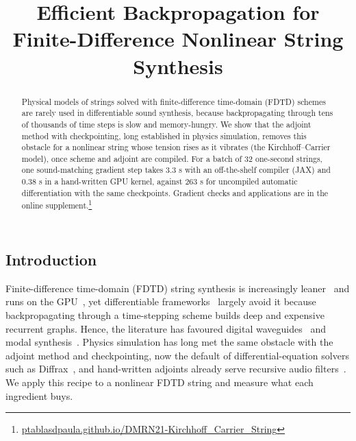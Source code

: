 \documentclass[a4paper]{article}
\title{Efficient Backpropagation for\\Finite-Difference Nonlinear String Synthesis}
\begin{document}
\ninept
\maketitle
\begin{sloppy}
\begin{abstract}
Physical models of strings solved with finite-difference time-domain (FDTD)
schemes are rarely used in differentiable sound synthesis, because
backpropagating through tens of thousands of time steps is slow and
memory-hungry. We show that the adjoint method with checkpointing, long
established in physics simulation, removes this obstacle for a nonlinear
string whose tension rises as it vibrates (the Kirchhoff--Carrier model),
once scheme and adjoint are compiled. For a batch of 32 one-second strings, one
sound-matching gradient step takes 3.3 s with an off-the-shelf compiler
(JAX) and 0.38 s in a hand-written GPU kernel, against 263 s for uncompiled
automatic differentiation with the same checkpoints. Gradient checks and
applications are in the online
supplement.\footnote{\fontsize{6}{7}\selectfont\url{ptablasdpaula.github.io/DMRN21-Kirchhoff_Carrier_String}}
\end{abstract}

\section{Introduction}
Finite-difference time-domain (FDTD) string synthesis is increasingly
leaner~\cite{bilbao2024guitar} and runs on the GPU~\cite{lee2024string}, yet differentiable
frameworks~\cite{hayes2024review} largely avoid it because
backpropagating through a time-stepping scheme builds deep and expensive
recurrent graphs. Hence, the literature has favoured
digital waveguides~\cite{tablas2026sound} and modal
synthesis~\cite{diaz2025}. Physics simulation has long met the same obstacle
with the adjoint method and checkpointing, now the default of
differential-equation solvers such as Diffrax~\cite{kidger2021}, and
hand-written adjoints already serve recursive audio
filters~\cite{yu2024allpole}. We apply this recipe to a nonlinear FDTD
string and measure what each ingredient buys.


\end{sloppy}
\end{document}
